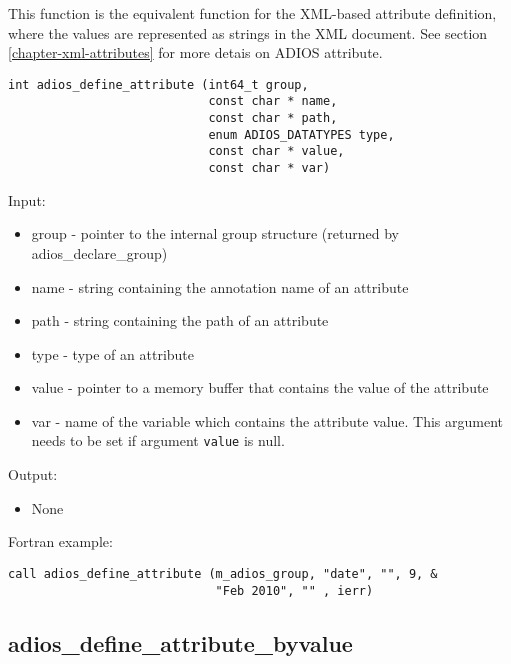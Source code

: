 This function is the equivalent function for the XML-based attribute definition, where the values are represented as strings in the XML document. See section \ref{chapter-xml-attributes} for more detais on ADIOS attribute.

\begin{lstlisting}[alsolanguage=C,caption={},label={}]
int adios_define_attribute (int64_t group,
                            const char * name, 
                            const char * path,
                            enum ADIOS_DATATYPES type,
                            const char * value,
                            const char * var)
\end{lstlisting}

Input:
\begin{itemize}
\item group - pointer to the internal group structure (returned by adios\_declare\_group)

\item name - string containing the annotation name of an attribute

\item path - string containing the path of an attribute

\item type  - type of an attribute

\item value - pointer to a memory buffer that contains the value of the attribute

\item var - name of the variable which contains the attribute value. This argument needs 
to be set if argument \verb+value+ is null.  
\end{itemize}

Output:
\begin{itemize}
\item None
\end{itemize}

Fortran example: 
\begin{lstlisting}[alsolanguage=Fortran,caption={},label={}]
call adios_define_attribute (m_adios_group, "date", "", 9, &
                             "Feb 2010", "" , ierr)
\end{lstlisting}


\subsection{adios\_define\_attribute\_byvalue}
\label{section-define-attribute-byvalue}

